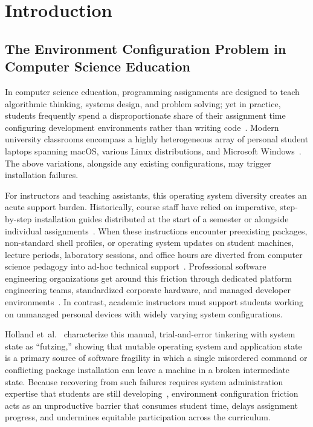 \chapter{Introduction}
\label{chap:intro}

\section{The Environment Configuration Problem in Computer Science Education}

In computer science education, programming assignments are designed to teach
algorithmic thinking, systems design, and problem solving; yet in practice,
students frequently spend a disproportionate share of their assignment time
configuring development environments rather than writing code~\cite{valstarUsingDevContainersStandardize2020,harvieUsingVirtualMachines2019,malanContainerizingCS50Standardizing2024}.
Modern university classrooms encompass a highly heterogeneous array of personal student
laptops spanning macOS, various Linux distributions, and Microsoft Windows~\cite{valstarUsingDevContainersStandardize2020,malanContainerizingCS50Standardizing2024}.
The above variations, alongside any existing configurations, may trigger
installation failures.

For instructors and teaching assistants, this operating system diversity creates an
acute support burden. Historically, course staff have relied on imperative, step-by-step
installation guides distributed at the start of a semester or alongside
individual assignments~\cite{valstarUsingDevContainersStandardize2020,harvieUsingVirtualMachines2019}.
When these instructions encounter preexisting packages, non-standard shell
profiles, or operating system updates on student machines, lecture periods, laboratory
sessions, and office hours are diverted from computer science pedagogy into ad-hoc
technical support~\cite{valstarUsingDevContainersStandardize2020,malanContainerizingCS50Standardizing2024}.
Professional software engineering organizations get around this friction through dedicated
platform engineering teams, standardized corporate hardware, and managed developer
environments~\cite{dolstraNixSafePolicyFree,functionalSoftware,OSCodeMy2024}. In
contrast, academic instructors must support students working on unmanaged personal
devices with widely varying system configurations.

Holland et~al.~\cite{hollandResearchIssuesNoFutz2001} characterize this manual, trial-and-error
tinkering with system state as ``futzing,'' showing that mutable operating
system and application state is a primary source of software fragility in which
a single misordered command or conflicting package installation can leave a
machine in a broken intermediate state. Because recovering from such failures requires
system administration expertise that students are still developing~\cite{hollandResearchIssuesNoFutz2001,harvieUsingVirtualMachines2019},
environment configuration friction acts as an unproductive barrier that consumes
student time, delays assignment progress, and undermines equitable participation
across the curriculum.

